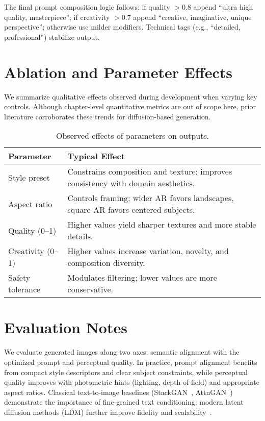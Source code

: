 \noindent The final prompt composition logic follows: if quality $> 0.8$ append ``ultra high quality, masterpiece''; if creativity $> 0.7$ append ``creative, imaginative, unique perspective''; otherwise use milder modifiers. Technical tags (e.g., ``detailed, professional'') stabilize output.

\section{Ablation and Parameter Effects}
We summarize qualitative effects observed during development when varying key controls. Although chapter-level quantitative metrics are out of scope here, prior literature corroborates these trends for diffusion-based generation.

\begin{table}[H]
\centering
\caption{Observed effects of parameters on outputs.}
\label{tab:effects}
\begin{tabular}{P{3.0cm} P{10.0cm}}
\toprule
\textbf{Parameter} & \textbf{Typical Effect} \\
\midrule
Style preset & Constrains composition and texture; improves consistency with domain aesthetics. \\
Aspect ratio & Controls framing; wider AR favors landscapes, square AR favors centered subjects. \\
Quality (0--1) & Higher values yield sharper textures and more stable details. \\
Creativity (0--1) & Higher values increase variation, novelty, and composition diversity. \\
Safety tolerance & Modulates filtering; lower values are more conservative. \\
\bottomrule
\end{tabular}
\end{table}

\section{Evaluation Notes}
We evaluate generated images along two axes: semantic alignment with the optimized prompt and perceptual quality. In practice, prompt alignment benefits from compact style descriptors and clear subject constraints, while perceptual quality improves with photometric hints (lighting, depth-of-field) and appropriate aspect ratios. Classical text-to-image baselines (StackGAN~\cite{zhang2017stackgan}, AttnGAN~\cite{xu2018attngan}) demonstrate the importance of fine-grained text conditioning; modern latent diffusion methods (LDM) further improve fidelity and scalability~\cite{rombach2022ldm}.

